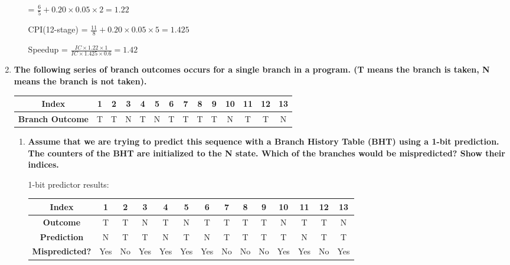 \begin{enumerate}
\begin{enumerate}
        = $\frac{6}{5} + 0.20 \times 0.05 \times 2 = 1.22$
        
        CPI(12-stage) = $\frac{11}{8} + 0.20 \times 0.05 \times 5 = 1.425$
        
        Speedup = $\frac{IC \times 1.22 \times 1}{IC \times 1.425 \times 0.6} = 1.42$
    \end{enumerate}
    
    \item \textbf{The following series of branch outcomes occurs for a single branch in a program. (T means the branch is taken, N means the branch is not taken).}
    \begin{center}
        \begin{tabular}{|c|c|c|c|c|c|c|c|c|c|c|c|c|c|}
            \hline
            \textbf{Index} & 1 & 2 & 3 & 4 & 5 & 6 & 7 & 8 & 9 & 10 & 11 & 12 & 13 \\
            \hline
            \textbf{Branch Outcome} & T & T & N & T & N & T & T & T & T & N & T & T & N \\
            \hline
        \end{tabular}
    \end{center}
    
    \begin{enumerate}
        \item \textbf{Assume that we are trying to predict this sequence with a Branch History Table (BHT) using a 1-bit prediction. The counters of the BHT are initialized to the N state. Which of the branches would be mispredicted? Show their indices.}
        
        1-bit predictor results:
        
        \begin{center}
            \begin{tabular}{|c|c|c|c|c|c|c|c|c|c|c|c|c|c|}
                \hline
                \textbf{Index} & 1 & 2 & 3 & 4 & 5 & 6 & 7 & 8 & 9 & 10 & 11 & 12 & 13 \\
                \hline
                \textbf{Outcome} & T & T & N & T & N & T & T & T & T & N & T & T & N \\
                \hline
                \textbf{Prediction} & N & T & T & N & T & N & T & T & T & T & N & T & T \\
                \hline
                \textbf{Mispredicted?} & Yes & No & Yes & Yes & Yes & Yes & No & No & No & Yes & Yes & No & Yes \\
                \hline
            \end{tabular}
        \end{center}
        

\end{enumerate}
\end{enumerate}
